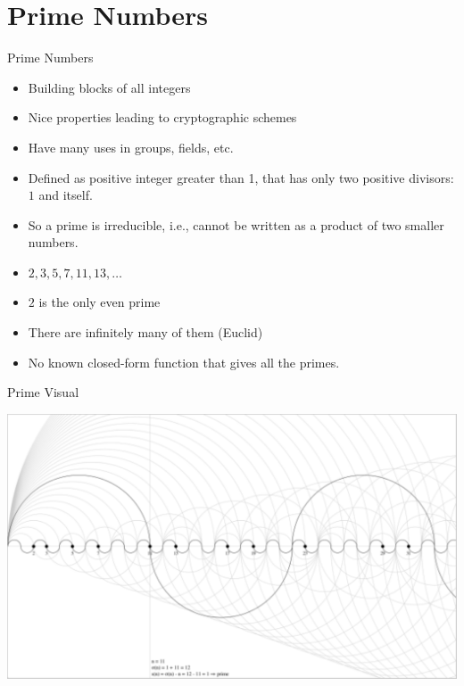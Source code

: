 \documentclass[ %
 usenames,dvipsnames,
aspectratio=169,11pt ]{beamer}
\newenvironment{stepitemize}{\begin{itemize}[<+->]}{\end{itemize} }
\begin{document}
\section{Prime Numbers}
\begin{frame}{Prime Numbers}
    \begin{stepitemize}
        \item Building blocks of all integers
        \item Nice properties leading to cryptographic schemes
        \item Have many uses in groups, fields, etc.
        \item Defined as positive integer greater than 1, that has only two positive divisors: $1$ and itself.
        \item So a prime is irreducible, i.e., cannot be written as a product of two smaller numbers.
        \item $2,3,5,7,11,13, \dots$
        \item $2$ is the only even prime
        \item There are infinitely many of them (Euclid)
        \item No known closed-form function that gives all the primes.
    \end{stepitemize}
\end{frame}

\begin{frame}{Prime Visual}
    \begin{center}
    \includegraphics[scale=.60]{prime-number-11.pdf}
\end{center}

\end{frame}
\end{document}
